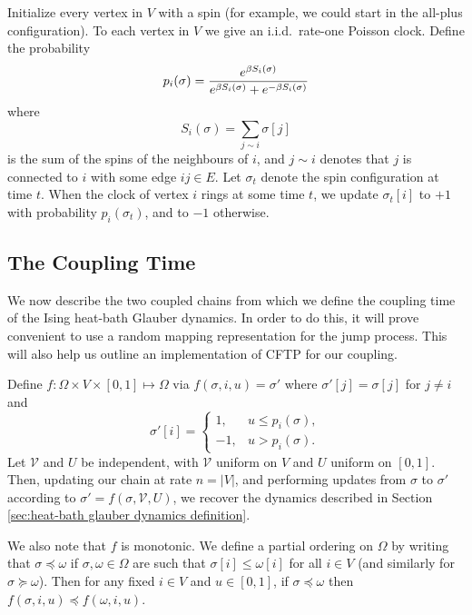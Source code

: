	Initialize every vertex in $V$ with a spin (for example, we could start in the all-plus configuration). To each vertex in $V$ we give an i.i.d.\ rate-one Poisson clock. Define the probability 
	\begin{equation}
		p_i(\sigma) = \frac{e^{\beta S_i(\sigma)}}{e^{\beta S_i(\sigma)} + e^{-\beta S_i(\sigma)}}
		\label{eq:define p_i}
	\end{equation}
	where
	\begin{equation}
		S_i(\sigma) = \sum_{j \sim i} \sigma[j]
	\end{equation}
	is the sum of the spins of the neighbours of $i$, and $j \sim i$ denotes that $j$ is connected to $i$ with some edge $ij \in E$. Let $\sigma_t$ denote the spin configuration at time $t$. When the clock of vertex $i$ rings at some time $t$, we update $\sigma_t[i]$ to $+1$ with probability $p_i(\sigma_t)$, and to $-1$ otherwise.

	\subsection{The Coupling Time}
	\label{sec:the coupling time}
	We now describe the two coupled chains from which we define the coupling time of the Ising heat-bath Glauber dynamics. In order to do this, it will prove convenient to use a random mapping representation for the jump process. This will also help us outline an implementation of CFTP for our coupling.

	Define $f: \Omega \times V \times [0,1] \mapsto \Omega$ via $f(\sigma, i, u) = \sigma'$ where $\sigma'[j] = \sigma[j]$ for $j \neq i$ and
	\begin{equation}
		\sigma'[i] = 
			\begin{cases}
				1, &u \leq p_i(\sigma),\\
				-1, &u > p_i(\sigma).
			\end{cases}
		\label{eq:plusorminusrules}
	\end{equation}
	Let $\mathscr{V}$ and $U$ be independent, with $\mathscr{V}$ uniform on $V$ and $U$ uniform on $[0,1]$. Then, updating our chain at rate $n = |V|$, and performing updates from $\sigma$ to $\sigma'$ according to $\sigma' = f(\sigma, \mathscr{V}, U)$, we recover the dynamics described in Section \ref{sec:heat-bath glauber dynamics definition}.

	We also note that $f$ is monotonic. We define a partial ordering on $\Omega$ by writing that $\sigma \preceq \omega$ if $\sigma, \omega \in \Omega$ are such that $\sigma[i] \leq \omega[i]$ for all $i \in V$ (and similarly for $\sigma \succeq \omega$). Then for any fixed $i \in V$ and $u \in [0,1]$, if $\sigma \preceq \omega$ then $f(\sigma, i, u) \preceq f(\omega, i, u)$.


